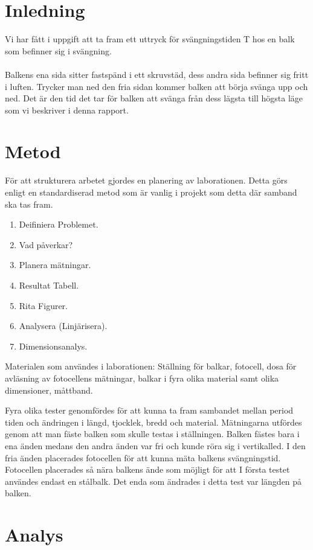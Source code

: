 \documentclass[10pt, titlepage, oneside, a4paper]{article}
\begin{document}
	\section{Inledning}
    Vi har fått i uppgift att ta fram ett uttryck för svängningstiden T hos en balk som befinner sig i svängning.\\\\Balkens ena sida sitter fastspänd i ett skruvstäd, dess andra sida befinner sig fritt i luften. Trycker man ned den fria sidan kommer balken att börja svänga upp och ned. Det är den tid det tar för balken att svänga från dess lägsta till högsta läge som vi beskriver i denna rapport. 
	\section{Metod}
    För att strukturera arbetet gjordes en planering av laborationen. Detta görs enligt en standardiserad metod som är vanlig i projekt som detta där samband ska tas fram.
    \begin{enumerate}
        \item Deifiniera Problemet.
        \item Vad påverkar?
        \item Planera mätningar.
        \item Resultat Tabell.
        \item Rita Figurer.
        \item Analysera (Linjärisera).
        \item Dimensionsanalys.
    \end{enumerate}

Materialen som användes i laborationen: Ställning för balkar, fotocell, dosa för avläsning av fotocellens mätningar, balkar i fyra olika material samt olika dimensioner, måttband.

 Fyra olika tester genomfördes för att kunna ta fram sambandet mellan period tiden och ändringen i längd, tjocklek, bredd och material.
Mätningarna utfördes genom att man fäste balken som skulle testas i ställningen. Balken fästes bara i ena änden medans den andra änden var fri och kunde röra sig i vertikalled. I den fria änden placerades fotocellen för att kunna mäta balkens svängningstid. Fotocellen placerades så nära balkens ände som möjligt för att   I första testet användes endast en stålbalk. Det enda som ändrades i detta test var längden på balken.

    \newpage
    \section{Analys}
    
\end{document}
